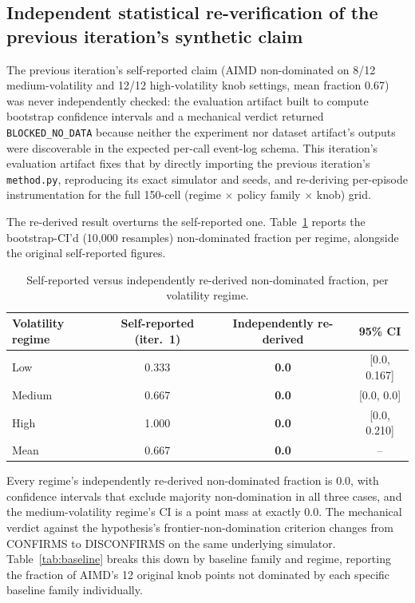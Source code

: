 \documentclass[11pt,letterpaper]{article}
\begin{document}
\subsection{Independent statistical re-verification of the previous iteration's synthetic claim}

The previous iteration's self-reported claim (AIMD non-dominated on 8/12 medium-volatility and 12/12
high-volatility knob settings, mean fraction 0.67) was never independently checked: the evaluation
artifact built to compute bootstrap confidence intervals and a mechanical verdict returned
\texttt{BLOCKED\_NO\_DATA} because neither the experiment nor dataset artifact's outputs were discoverable in the
expected per-call event-log schema. This iteration's evaluation artifact fixes that by directly importing
the previous iteration's \texttt{method.py}, reproducing its exact simulator and seeds, and re-deriving
per-episode instrumentation for the full 150-cell (regime $\times$ policy family $\times$ knob) grid.

The re-derived result overturns the self-reported one. Table~\ref{tab:reversal} reports the bootstrap-CI'd (10,000
resamples) non-dominated fraction per regime, alongside the original self-reported figures.

\begin{table}[!htbp]
\centering
\caption{Self-reported versus independently re-derived non-dominated fraction, per volatility regime.}
\label{tab:reversal}
\begin{tabular}{lccc}
\toprule
Volatility regime & Self-reported (iter.\ 1) & Independently re-derived & 95\% CI \\
\midrule
Low & 0.333 & \textbf{0.0} & [0.0, 0.167] \\
Medium & 0.667 & \textbf{0.0} & [0.0, 0.0] \\
High & 1.000 & \textbf{0.0} & [0.0, 0.210] \\
Mean & 0.667 & \textbf{0.0} & -- \\
\bottomrule
\end{tabular}
\end{table}

Every regime's independently re-derived non-dominated fraction is 0.0, with confidence intervals that
exclude majority non-domination in all three cases, and the medium-volatility regime's CI is a point mass
at exactly 0.0. The mechanical verdict against the hypothesis's frontier-non-domination criterion changes
from CONFIRMS to DISCONFIRMS on the same underlying simulator. Table~\ref{tab:baseline} breaks this down by baseline
family and regime, reporting the fraction of AIMD's 12 original knob points not dominated by each specific
baseline family individually.
\end{document}
